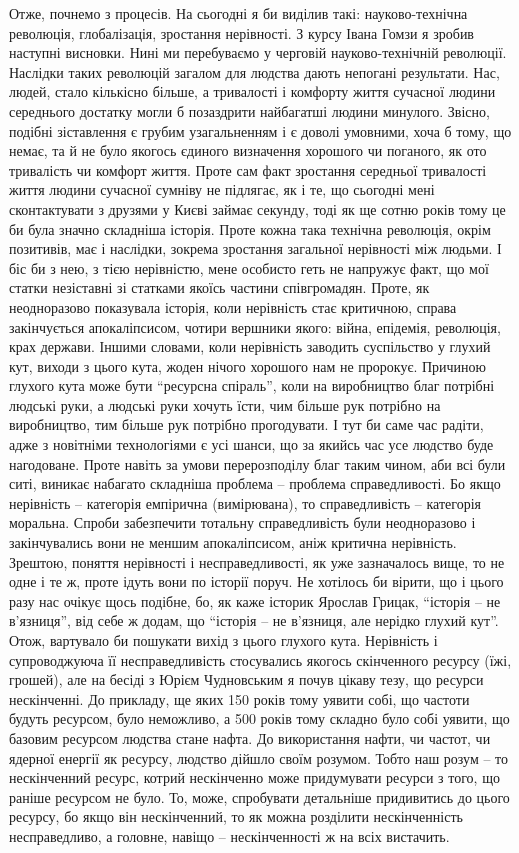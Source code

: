 Отже, почнемо з процесів. На сьогодні я би виділив такі: науково-технічна
революція, глобалізація, зростання нерівності. З курсу Івана Гомзи я зробив
наступні висновки. Нині ми перебуваємо у черговій науково-технічній революції.
Наслідки таких революцій загалом для людства дають непогані результати. Нас,
людей, стало кількісно більше, а тривалості і комфорту життя сучасної людини
середнього достатку могли б позаздрити найбагатші людини минулого. Звісно,
подібні зіставлення є грубим узагальненням і є доволі умовними, хоча б тому, що
немає, та й не було якогось єдиного визначення хорошого чи поганого, як ото
тривалість чи комфорт життя. Проте сам факт зростання середньої тривалості
життя людини сучасної сумніву не підлягає, як і те, що сьогодні мені
сконтактувати з друзями у Києві займає секунду, тоді як ще сотню років тому це
би була значно складніша історія. Проте кожна така технічна революція, окрім
позитивів, має і наслідки, зокрема зростання загальної нерівності між людьми. І
біс би з нею, з тією нерівністю, мене особисто геть не напружує факт, що мої
статки незіставні зі статками якоїсь частини співгромадян. Проте, як
неодноразово показувала історія, коли нерівність стає критичною, справа
закінчується апокаліпсисом, чотири вершники якого: війна, епідемія, революція,
крах держави. Іншими словами, коли нерівність заводить суспільство у глухий
кут, виходи з цього кута, жоден нічого хорошого нам не пророкує. Причиною
глухого кута може бути \enquote{ресурсна спіраль}, коли на виробництво благ потрібні
людські руки, а людські руки хочуть їсти, чим більше рук потрібно на
виробництво, тим більше рук потрібно прогодувати. І тут би саме час радіти,
адже з новітніми технологіями є усі шанси, що за якийсь час усе людство буде
нагодоване. Проте навіть за умови перерозподілу благ таким чином, аби всі були
ситі, виникає набагато складніша проблема – проблема справедливості. Бо якщо
нерівність – категорія емпірична (вимірювана), то справедливість – категорія
моральна. Спроби забезпечити тотальну справедливість були неодноразово і
закінчувались вони не меншим апокаліпсисом, аніж критична нерівність. Зрештою,
поняття нерівності і несправедливості, як уже зазначалось вище, то не одне і те
ж, проте ідуть вони по історії поруч. Не хотілось би вірити, що і цього разу
нас очікує щось подібне, бо, як каже історик Ярослав Грицак, \enquote{історія – не
в’язниця}, від себе ж додам, що \enquote{історія – не в’язниця, але нерідко глухий
кут}. Отож, вартувало би пошукати вихід з цього глухого кута. Нерівність і
супроводжуюча її несправедливість стосувались якогось скінченного ресурсу (їжі,
грошей), але на бесіді з Юрієм Чудновським я почув цікаву тезу, що ресурси
нескінченні. До прикладу, ще яких 150 років тому уявити собі, що частоти будуть
ресурсом, було неможливо, а 500 років тому складно було собі уявити, що базовим
ресурсом людства стане нафта. До використання нафти, чи частот, чи ядерної
енергії як ресурсу, людство дійшло своїм розумом. Тобто наш розум – то
нескінченний ресурс, котрий нескінченно може придумувати ресурси з того, що
раніше ресурсом не було. То, може, спробувати детальніше придивитись до цього
ресурсу, бо якщо він нескінченний, то як можна розділити нескінченність
несправедливо, а головне, навіщо – нескінченності ж на всіх вистачить.

